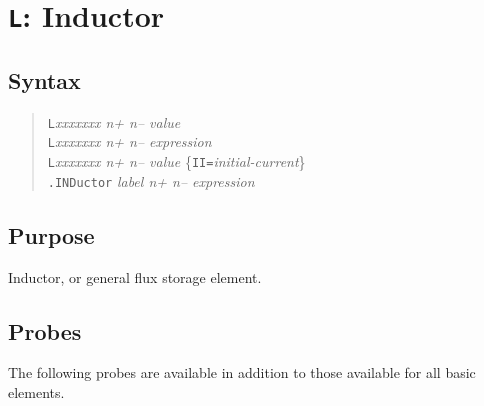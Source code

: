 %
%
%
%
\section{{\tt L}: Inductor}
\subsection{Syntax}
\begin{verse}
{\tt L}{\it xxxxxxx n+ n-- value}\\
{\tt L}{\it xxxxxxx n+ n-- expression}\\
{\tt L}{\it xxxxxxx n+ n-- value} \{{\tt II=}{\it initial-current}\}\\
{\tt .INDuctor} {\it label n+ n-- expression}
\end{verse}
\subsection{Purpose}

Inductor, or general flux storage element.
\subsection{Probes}

The following probes are available in addition to those available for
all basic elements. 

